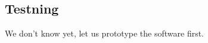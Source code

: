 \documentclass[12pt,a4paper]{article}
\begin{document}
\subsection{Testning}

We don't know yet, let us prototype the software first.





\end{document}
